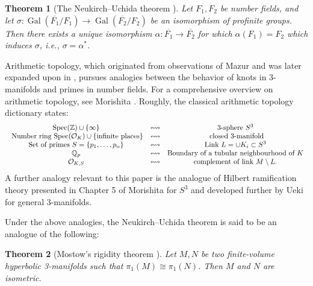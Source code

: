 \documentclass{amsart}
\theoremstyle{plain}
\theoremstyle{definition}
\theoremstyle{plain}
\theoremstyle{plain}
\theoremstyle{plain}
\theoremstyle{remark}
\theoremstyle{remark}
\theoremstyle{plain}
\theoremstyle{definition}
\theoremstyle{plain}
\DeclareMathOperator{\Gal}{\mathrm{Gal}}
\DeclareMathOperator{\Spec}{\mathrm{Spec}}
\theoremstyle{plain}
\theoremstyle{plain}
\newtheorem*{theorem*}{Theorem}
\numberwithin{equation}{section}
\begin{document}
\begin{theorem*}[The Neukirch--Uchida theorem \cite{neukirchcrelle, neukirchinvenciones, uchida}]\label{thm:NU}
Let $F_1, F_2$ be number fields, and let $\sigma: \Gal(\overline{F_1}/F_1) \to \Gal(\overline{F_2}/F_2)$ be an isomorphism of profinite groups. Then there exists a unique isomorphism $\alpha: \overline{F_1} \to \overline{F_2}$ for which $\alpha(F_1)=F_2$ which induces $\sigma$, i.e., $\sigma = \alpha^*$. 
\end{theorem*}

Arithmetic topology, which originated from observations of Mazur \cite{mazur2} and was later expanded upon in \cite{mazur1973notes}, pursues analogies between the behavior of knots in 3-manifolds and primes in number fields. For a comprehensive overview on arithmetic topology, see Morishita \cite{morishita2012knots}. Roughly, the classical arithmetic topology dictionary states:
\[
\begin{array}{ccc}
\text{\ensuremath{\Spec(\mathbb{Z})\cup\{\infty\}}} & \leftrightsquigarrow & \text{3-sphere \ensuremath{S^{3}}}\\ \text{ Number ring $\Spec(\mathcal{O}_K)\cup\{\text{infinite places}\}$} & \leftrightsquigarrow & \text{ closed 3-manifold}\\
\text{Set of primes \ensuremath{S=\{p_1,\dots,p_n\}}} & \leftrightsquigarrow & \text{Link \ensuremath{L=\cup K_i\subset S^{3}}}\\
\text{\ensuremath{\mathbb{Q}_{p}}} & \leftrightsquigarrow & \text{Boundary of a tubular neighbourhood of \ensuremath{K}}\\
\text{\ensuremath{\mathcal{O}_{K,S}}} & \leftrightsquigarrow & \text{complement of link $M\setminus L$.}
\end{array}
\]
A further analogy relevant to this paper is the analogue of Hilbert ramification theory presented in Chapter 5 of Morishita \cite{morishita2012knots} for $S^3$ and developed further by Ueki \cite{uekibranched} for general 3-manifolds. 

\medskip

Under the above analogies, the Neukirch--Uchida theorem is said to be an analogue of the following:

\begin{theorem*}[Mostow's rigidity theorem \cite{mostow}]
Let $M, N$ be two finite-volume hyperbolic 3-manifolds such that $\pi_1(M) \cong \pi_1(N)$. Then $M$ and $N$ are isometric.
\end{theorem*}
\end{document}
